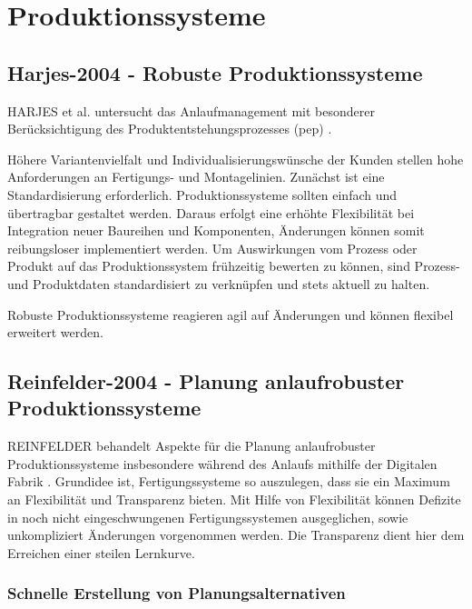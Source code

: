 \section{Produktionssysteme}

\subsection*{Harjes-2004 - Robuste Produktionssysteme}
HARJES et al. untersucht das Anlaufmanagement mit besonderer Berücksichtigung des Produktentstehungsprozesses (\gls{pep}) \cite{Harjes2004}. 

Höhere Variantenvielfalt und Individualisierungswünsche der Kunden stellen hohe Anforderungen an Fertigungs- und Montagelinien. Zunächst ist eine Standardisierung erforderlich. Produktionssysteme sollten einfach und übertragbar gestaltet werden. Daraus erfolgt eine erhöhte Flexibilität bei Integration neuer Baureihen und Komponenten, Änderungen können somit reibungsloser implementiert werden. Um Auswirkungen vom Prozess oder Produkt auf das Produktionssystem frühzeitig bewerten zu können, sind Prozess- und Produktdaten standardisiert zu verknüpfen und stets aktuell zu halten. 

Robuste Produktionssysteme reagieren agil auf Änderungen und können flexibel erweitert werden. 

\subsection*{Reinfelder-2004 - Planung anlaufrobuster Produktionssysteme}

REINFELDER behandelt Aspekte für die Planung anlaufrobuster Produktionssysteme insbesondere während des Anlaufs mithilfe der Digitalen Fabrik %
\cite{Reinfelder2004}. 
Grundidee ist, Fertigungssysteme so auszulegen, dass sie ein Maximum an Flexibilität und Transparenz bieten. Mit Hilfe von Flexibilität können Defizite in noch nicht eingeschwungenen Fertigungssystemen ausgeglichen, sowie unkompliziert Änderungen vorgenommen werden. Die Transparenz dient hier dem Erreichen einer steilen Lernkurve. 

\subsubsection{Schnelle Erstellung von Planungsalternativen}

